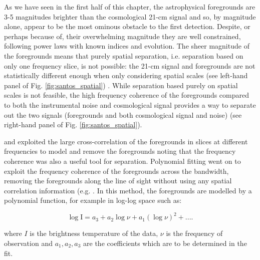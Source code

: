 As we have seen in the first half of this chapter, the astrophysical foregrounds are 3-5 magnitudes brighter than the cosmological 21-cm signal and so, by magnitude alone, appear to be the most ominous obstacle to the first detection. Despite, or perhaps because of, their overwhelming magnitude they are well constrained, following power laws with known indices and evolution. The sheer magnitude of the foregrounds means that purely spatial separation, i.e. separation based on only one frequency slice, is not possible: the 21-cm signal and foregrounds are not statistically different enough when only considering spatial scales (see left-hand panel of Fig. \ref{fig:santos_spatial}) \cite{Santos2005ApJ...625..575S,DiMatteo2004MNRAS.355.1053D,Oh2003MNRAS.346..871O,DiMatteo2002ApJ...564..576D}. While separation based purely on spatial scales is not feasible, the high frequency coherence of the foregrounds compared to both the instrumental noise and cosmological signal provides a way to separate out the two signals (foregrounds and both cosmological signal and noise) (see right-hand panel of Fig. \ref{fig:santos_spatial}). 

\cite{Santos2005ApJ...625..575S} and \cite{Zal2004ApJ...608..622Z} exploited the large cross-correlation of the foregrounds in slices at different frequencies to model and remove the foregrounds noting that the frequency coherence was also a useful tool for separation. Polynomial fitting went on to exploit the frequency coherence of the foregrounds across the bandwidth, removing the foregrounds along the line of sight without using any spatial correlation information (e.g. \cite{Bowman2009ApJ...695..183B,Wang2006ApJ...650..529W,Mcquinn2006ApJ...653..815M}. In this method, the foregrounds are modelled by a polynomial function, for example in log-log space such as:

\begin{equation}
\mathrm{\log I} = a_3 +a_2\log\nu + a_1(\log \nu)^2 + ....
\end{equation}

\noindent where $I$ is the brightness temperature of the data, $\nu$ is the frequency of observation and $a_1,a_2,a_3$ are the coefficients which are to be determined in the fit.

